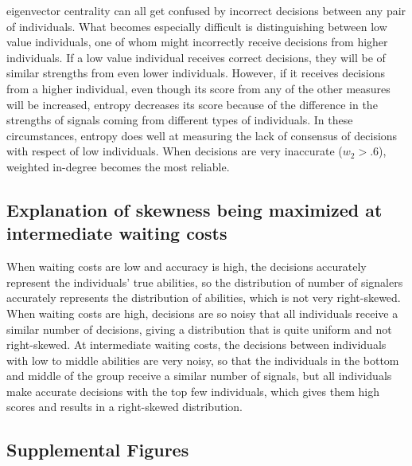 \documentclass{article}
\begin{document}
eigenvector centrality can all get confused by incorrect decisions between any pair of individuals. What becomes especially difficult is distinguishing between low value individuals, one of whom might incorrectly receive decisions from higher individuals. If a low value individual receives correct decisions, they will be of similar strengths from even lower individuals. However, if it receives decisions from a higher individual, even though its score from any of the other measures will be increased, entropy decreases its score because of the difference in the strengths of signals coming from different types of individuals. In these circumstances, entropy does well at measuring the lack of consensus of decisions with respect of low individuals. When decisions are very inaccurate ($w_2>.6$), weighted in-degree becomes the most reliable.
 
 
\subsection{Explanation of skewness being maximized at intermediate waiting costs}
When waiting costs are low and accuracy is high, the decisions accurately represent the individuals' true  abilities, so the distribution of number of signalers accurately represents the distribution of abilities, which is not very right-skewed.  When waiting costs are high, decisions are so noisy that all individuals receive a similar number of decisions, giving a distribution that is quite uniform and not right-skewed.  At intermediate waiting costs, the decisions between individuals with low to middle abilities are very noisy, so that the individuals in the bottom and middle of the group receive a similar number of signals, but all individuals make accurate decisions with the top few individuals, which gives them high scores and results in a right-skewed distribution.





\subsection{Supplemental Figures }
\end{document}
